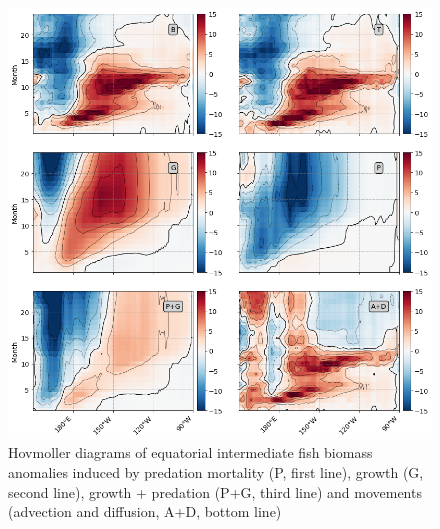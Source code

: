 \begin{figure}
	\centering
	\includegraphics[scale=0.4]{figs/hov_compo_l_20.png}	
	\caption{Hovmoller diagrams of equatorial intermediate fish biomass anomalies induced by predation mortality (P, first line), growth (G, second line), growth + predation (P+G, third line) and movements (advection and diffusion, A+D, bottom line)}	
	\label{fig:hov_ape_trends_20}
\end{figure}

